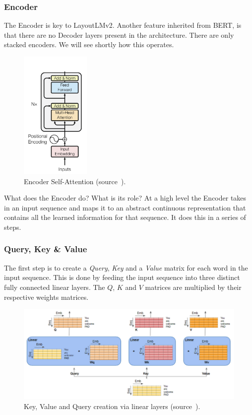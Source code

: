 \subsubsection{Encoder}
The Encoder is key to LayoutLMv2. Another feature inherited from BERT, is that there are no Decoder layers present in the architecture.
There are only stacked encoders. We will see shortly how this operates.
\begin{figure}[H]
	\centering
	\includegraphics[width=0.3\textwidth]{figures/encoder_close_up.png}
	\caption[Encoder Self-Attention]{Encoder Self-Attention (source~\autocite{vaswaniAttentionAllYou}).}
	\label{fig:encoder_close_up}
\end{figure}
What does the Encoder do? What is its role? At a high level the Encoder takes in an input sequence and maps it to an abstract
continuous representation that contains all the learned information for that sequence.
It does this in a series of steps.
\subsubsection{Query, Key \& Value}
The first step is to create a \emph{Query}, \emph{Key} and a \emph{Value} matrix for each word in the input sequence. This is done by feeding the input sequence into
three distinct fully connected linear layers. The $Q$, $K$ and $V$ matrices are multiplied by their
respective weights matrices.
\bigbreak
\begin{figure}[H]
	\centering
	\includegraphics[width=1\textwidth]{figures/k_v_q_linear_layers.png}
	\caption{Key, Value and Query creation via linear layers (source~\autocite{doshiTransformersExplainedVisually2021a}).}
	\label{fig:kvq_ll}
\end{figure}
